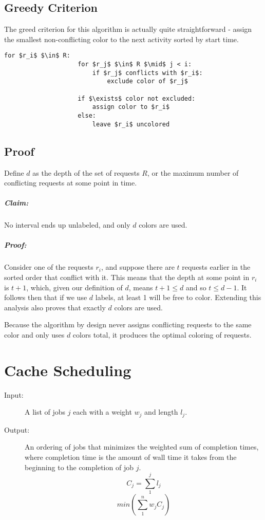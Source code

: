 \documentclass[11pt]{article}
\begin{document}
		\subsection{Greedy Criterion}
			The greed criterion for this algorithm is actually quite straightforward - assign the smallest non-conflicting color to the next activity sorted by start time.
			
			\begin{lstlisting}[autogobble=true,mathescape]
				for $r_i$ $\in$ R:
					for $r_j$ $\in$ R $\mid$ j < i:
						if $r_j$ conflicts with $r_i$:
							exclude color of $r_j$
							
					if $\exists$ color not excluded:
						assign color to $r_i$
					else:
						leave $r_i$ uncolored
			\end{lstlisting}
		
		\subsection{Proof}
			Define $d$ as the depth of the set of requests $R$, or the maximum number of conflicting requests at some point in time.
			
			\subparagraph{Claim:} No interval ends up unlabeled, and only $d$ colors are used.
			
			\subparagraph{Proof:} Consider one of the requests $r_i$, and suppose there are $t$ requests earlier in the sorted order that conflict with it. This means that the depth at some point in $r_i$ is $t + 1$, which, given our definition of $d$, means $t + 1\leq d$ and so $t \leq d - 1$. It follows then that if we use $d$ labels, at least 1 will be free to color. Extending this analysis also proves that exactly $d$ colors are used.
			
			Because the algorithm by design never assigns conflicting requests to the same color and only uses $d$ colors total, it produces the optimal coloring of requests.
		

\section{Cache Scheduling}
	\begin{description}
		\item[Input:] A list of jobs $j$ each with a weight $w_j$ and length $l_j$.
		\item[Output:] An ordering of jobs that minimizes the weighted sum of completion times, where completion time is the amount of wall time it takes from the beginning to the completion of job $j$.
		\[C_j = \sum_1^j l_j\]
		\[min(\sum_1^nw_jC_j)\]
	\end{description}
	
\end{document}
